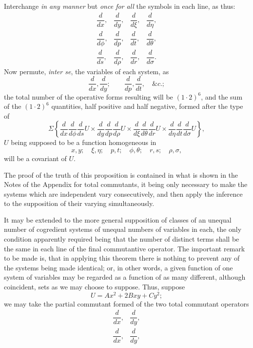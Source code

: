 \documentclass[11pt]{article}
\newcommand{\sourcepage}[1]{\marginpar{\scriptsize p.~#1}}
\begin{document}
{{\sourcepage{319}
Interchange \emph{in any manner} but \emph{once for all} the symbols in each line, as thus:
\[
\begin{array}{cccc}
\dfrac{d}{dx},&\dfrac{d}{dy},&\dfrac{d}{d\xi},&\dfrac{d}{d\eta},\\[0.6em]
\dfrac{d}{d\phi},&\dfrac{d}{dp},&\dfrac{d}{dt},&\dfrac{d}{d\theta},\\[0.6em]
\dfrac{d}{ds},&\dfrac{d}{d\rho},&\dfrac{d}{dr},&\dfrac{d}{d\sigma}.
\end{array}
\]
Now permute, \emph{inter se}, the variables of each system, as
\[
\frac{d}{dx},\frac{d}{dy};\qquad \frac{d}{dp},\frac{d}{dt},\quad \&c.;
\]
the total number of the operative forms resulting will be $(1\cdot2)^6$, and the sum of the $(1\cdot2)^6$ quantities, half positive and half negative, formed after the type of
\[
\Sigma\left\{
\frac{d}{dx}\frac{d}{d\phi}\frac{d}{ds}U\times
\frac{d}{dy}\frac{d}{dp}\frac{d}{d\rho}U
\times
\frac{d}{d\xi}\frac{d}{d\theta}\frac{d}{dr}U\times
\frac{d}{d\eta}\frac{d}{dt}\frac{d}{d\sigma}U
\right\},
\]
$U$ being supposed to be a function homogeneous in
\[
x,y;\quad \xi,\eta;\quad p,t;\quad \phi,\theta;\quad r,s;\quad \rho,\sigma,
\]
will be a covariant of $U$.

The proof of the truth of this proposition is contained in what is shown in the Notes of the Appendix for total commutants, it being only necessary to make the systems which are independent vary consecutively, and then apply the inference to the supposition of their varying simultaneously.

It may be extended to the more general supposition of classes of an unequal number of cogredient systems of unequal numbers of variables in each, the only condition apparently required being that the number of distinct terms shall be the same in each line of the final commutantive operator. The important remark to be made is, that in applying this theorem there is nothing to prevent any of the systems being made identical; or, in other words, a given function of one system of variables may be regarded as a function of as many different, although coincident, sets as we may choose to suppose. Thus, suppose
\[
U=Ax^2+2Bxy+Cy^2;
\]
we may take the partial commutant formed of the two total commutant operators
\[
\begin{array}{cc}
\dfrac{d}{dx},&\dfrac{d}{dy},\\[0.6em]
\dfrac{d}{dx},&\dfrac{d}{dy},
\end{array}
\]

}}
\end{document}
